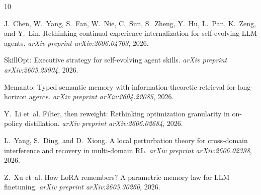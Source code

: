 \documentclass[11pt,a4paper]{article}
\begin{document}

\begin{thebibliography}{10}

J.~Chen, W.~Yang, S.~Fan, W.~Nie, C.~Sun, S.~Zheng, Y.~Hu, L.~Pan, K.~Zeng, and Y.~Lin.
\newblock Rethinking continual experience internalization for self-evolving {LLM} agents.
\newblock \emph{arXiv preprint arXiv:2606.04703}, 2026.

SkillOpt: Executive strategy for self-evolving agent skills.
\newblock \emph{arXiv preprint arXiv:2605.23904}, 2026.

Memanto: Typed semantic memory with information-theoretic retrieval for long-horizon agents.
\newblock \emph{arXiv preprint arXiv:2604.22085}, 2026.

Y.~Li et~al.
\newblock Filter, then reweight: Rethinking optimization granularity in on-policy distillation.
\newblock \emph{arXiv preprint arXiv:2606.02684}, 2026.

L.~Yang, S.~Ding, and D.~Xiong.
\newblock A local perturbation theory for cross-domain interference and recovery in multi-domain {RL}.
\newblock \emph{arXiv preprint arXiv:2606.02398}, 2026.

Z.~Xu et~al.
\newblock How {LoRA} remembers? {A} parametric memory law for {LLM} finetuning.
\newblock \emph{arXiv preprint arXiv:2605.30260}, 2026.

\end{thebibliography}
\end{document}
